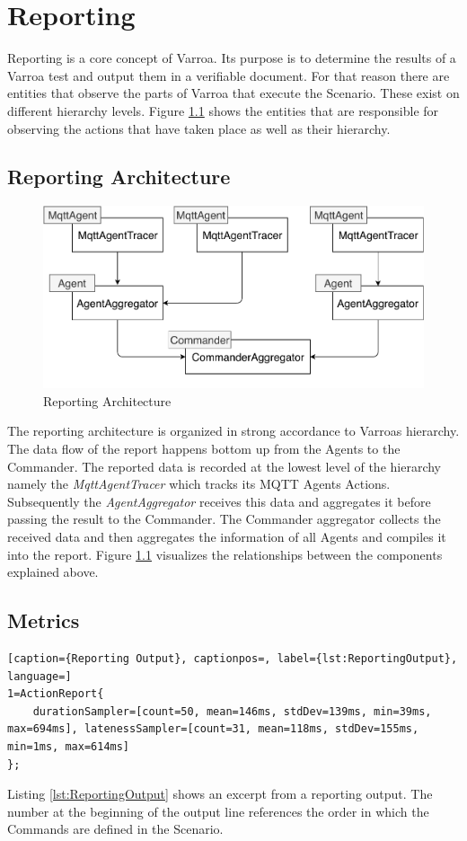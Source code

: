 \chapter{Reporting}\label{sec:Reporting}
Reporting is a core concept of Varroa.
Its purpose is to determine the results of a Varroa test and output them in a verifiable document.
For that reason there are entities that observe the parts of Varroa that execute the Scenario.
These exist on different hierarchy levels.
Figure \ref{fig:ReportingArchitecture} shows the entities that are responsible for observing the actions that have taken place as well as their hierarchy.

\section{Reporting Architecture}
\begin{figure}[H]
	\begin{center}
		\includegraphics[scale=0.75]{Resources/PDF/ReportingArchitecture}
		\caption{Reporting Architecture}
		\label{fig:ReportingArchitecture}
	\end{center}
\end{figure}
The reporting architecture is organized in strong accordance to Varroas hierarchy.
The data flow of the report happens bottom up from the Agents to the Commander.
The reported data is recorded at the lowest level of the hierarchy namely the \emph{MqttAgentTracer} which tracks its MQTT Agents Actions.
Subsequently the \emph{AgentAggregator} receives this data and aggregates it before passing the result to the Commander.
The Commander aggregator collects the received data and then aggregates the information of all Agents and compiles it into the report.
Figure \ref{fig:ReportingArchitecture} visualizes the relationships between the components explained above.

\section{Metrics}
\begin{lstlisting}[caption={Reporting Output}, captionpos=, label={lst:ReportingOutput}, language=]
1=ActionReport{
	durationSampler=[count=50, mean=146ms, stdDev=139ms, min=39ms, max=694ms], latenessSampler=[count=31, mean=118ms, stdDev=155ms, min=1ms, max=614ms]
};
\end{lstlisting}
Listing \ref{lst:ReportingOutput} shows an excerpt from a reporting output.
The number at the beginning of the output line references the order in which the Commands are defined in the Scenario.
